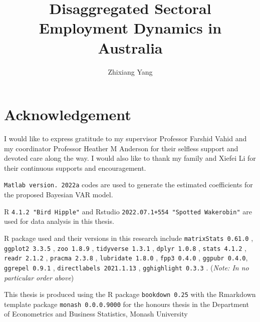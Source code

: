 \documentclass{monashthesis}
\author{Zhixiang Yang}
\title{Disaggregated Sectoral Employment Dynamics in Australia}
\begin{document}

\titlepage

{\sf\tighttoc\doublespacing}

\clearpage{}\setcounter{page}{0}

\hypertarget{acknowledgement}{%
\chapter*{Acknowledgement}\label{acknowledgement}}

I would like to express gratitude to my supervisor Professor Farshid Vahid and my coordinator Professor Heather M Anderson for their selfless support and devoted care along the way. I would also like to thank my family and Xiefei Li for their continuous supports and encouragement.

\vspace{48pt}

\texttt{Matlab\ version.\ 2022a} codes are used to generate the estimated coefficients for the proposed Bayesian VAR model.

R \texttt{4.1.2\ "Bird\ Hipple"} \autocite{R} and Rstudio \texttt{2022.07.1+554\ "Spotted\ Wakerobin"} \autocite{Rstudio} are used for data analysis in this thesis.

\vspace{12pt}

R package used and their versions in this research include \texttt{matrixStats\ 0.61.0} \autocite{package_matrixStats}, \texttt{ggplot2\ 3.3.5} \autocite{package_ggplot2}, \texttt{zoo\ 1.8.9} \autocite{zoo}, \texttt{tidyverse\ 1.3.1} \autocite{tidyverse}, \texttt{dplyr\ 1.0.8} \autocite{dplyr}, \texttt{stats\ 4.1.2} \autocite{stats}, \texttt{readr\ 2.1.2} \autocite{readr}, \texttt{pracma\ 2.3.8} \autocite{pracma}, \texttt{lubridate\ 1.8.0} \autocite{lubridate}, \texttt{fpp3\ 0.4.0} \autocite{fpp3}, \texttt{ggpubr\ 0.4.0}\autocite{ggpubr}, \texttt{ggrepel\ 0.9.1} \autocite{ggrepel}, \texttt{directlabels\ 2021.1.13} \autocite{directlabels}, \texttt{gghighlight\ 0.3.3} \autocite{gghighlight}.
(\emph{Note: In no particular order above})

\vspace{12pt}

This thesis is produced using the R package \texttt{bookdown\ 0.25} \autocite{bookdown} with the Rmarkdown template package \texttt{monash\ 0.0.0.9000} for the honours thesis in the Department of Econometrics and Business Statistics, Monash University \autocite{monash}
\end{document}
